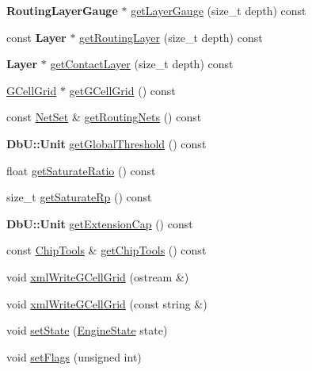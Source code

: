 \begin{DoxyCompactItemize}
{\bf Routing\-Layer\-Gauge} $\ast$ \hyperlink{classKatabatic_1_1KatabaticEngine_a93f9c18075b02f7fd7ba03d951f6be56}{get\-Layer\-Gauge} (size\-\_\-t depth) const 
\item 
const {\bf Layer} $\ast$ \hyperlink{classKatabatic_1_1KatabaticEngine_a3dcc03dc20b0bdca03772901316ba6b3}{get\-Routing\-Layer} (size\-\_\-t depth) const 
\item 
{\bf Layer} $\ast$ \hyperlink{classKatabatic_1_1KatabaticEngine_a2b7ddb281e0b785b5d28d284bdd1f77c}{get\-Contact\-Layer} (size\-\_\-t depth) const 
\item 
\hyperlink{classKatabatic_1_1GCellGrid}{G\-Cell\-Grid} $\ast$ \hyperlink{classKatabatic_1_1KatabaticEngine_a0702328522e94ca9705222cd5b9e9c6d}{get\-G\-Cell\-Grid} () const 
\item 
const \hyperlink{classKatabatic_1_1KatabaticEngine_a92ed88f9aecd2f195089c4029fa8bcc7}{Net\-Set} \& \hyperlink{classKatabatic_1_1KatabaticEngine_a7b752887b598b0244207f36eb13b9149}{get\-Routing\-Nets} () const 
\item 
{\bf Db\-U\-::\-Unit} \hyperlink{classKatabatic_1_1KatabaticEngine_ae375ec4d6fe84babba01c056a32d5a83}{get\-Global\-Threshold} () const 
\item 
float \hyperlink{classKatabatic_1_1KatabaticEngine_a1563b5789b3cd5db8dc6fc1cc069dc82}{get\-Saturate\-Ratio} () const 
\item 
size\-\_\-t \hyperlink{classKatabatic_1_1KatabaticEngine_a929aa539d03f19c7edbf6b34d7ec30a3}{get\-Saturate\-Rp} () const 
\item 
{\bf Db\-U\-::\-Unit} \hyperlink{classKatabatic_1_1KatabaticEngine_a7b6417a63eaf4f4d3f423dbdb8c13302}{get\-Extension\-Cap} () const 
\item 
const \hyperlink{classKatabatic_1_1ChipTools}{Chip\-Tools} \& \hyperlink{classKatabatic_1_1KatabaticEngine_a53565592ca14ec9f302d068327d846c8}{get\-Chip\-Tools} () const 
\item 
void \hyperlink{classKatabatic_1_1KatabaticEngine_aecbe8bdcc61024a7539de3ea932c5e06}{xml\-Write\-G\-Cell\-Grid} (ostream \&)
\item 
void \hyperlink{classKatabatic_1_1KatabaticEngine_a78394ac380a0fa462f268dcc2becc50e}{xml\-Write\-G\-Cell\-Grid} (const string \&)
\item 
void \hyperlink{classKatabatic_1_1KatabaticEngine_a2391b9bfcb773398b9661b5ac0ef1a30}{set\-State} (\hyperlink{namespaceKatabatic_ab9e409db5feff0bdbc85e90e2a029cda}{Engine\-State} state)
\item 
void \hyperlink{classKatabatic_1_1KatabaticEngine_aeb14f94914af58657a0dc2f50ec98df5}{set\-Flags} (unsigned int)

\end{DoxyCompactItemize}
